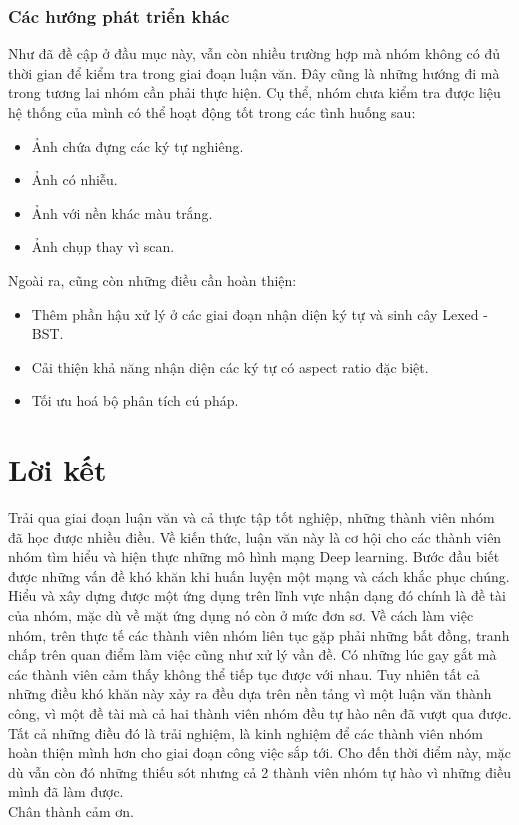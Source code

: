 \documentclass[a4paper]{article}
\theoremstyle{definition}
\begin{document}
	\subsubsection{Các hướng phát triển khác}
	Như đã đề cập ở đầu mục này, vẫn còn nhiều trường hợp mà nhóm không có đủ thời gian để kiểm tra trong giai đoạn luận văn. Đây cũng là những hướng đi mà trong tương lai nhóm cần phải thực hiện. Cụ thể, nhóm chưa kiểm tra được liệu hệ thống của mình có thể hoạt động tốt trong các tình huống sau:
	\begin{itemize}
		\item Ảnh chứa đựng các ký tự nghiêng.
		\item Ảnh có nhiễu.
		\item Ảnh với nền khác màu trắng.
		\item Ảnh chụp thay vì scan.
		
	\end{itemize}
	\vspace{1cm}
	Ngoài ra, cũng còn những điều cần hoàn thiện:
	\begin{itemize}
		\item Thêm phần hậu xử lý ở các giai đoạn nhận diện ký tự và sinh cây Lexed - BST.
		\item Cải thiện khả năng nhận diện các ký tự có aspect ratio đặc biệt.
		\item Tối ưu hoá bộ phân tích cú pháp. 
	\end{itemize}
	
	\newpage
	\section*{Lời kết}
	Trải qua giai đoạn luận văn và cả thực tập tốt nghiệp, những thành viên nhóm đã học được nhiều điều. Về kiến thức, luận văn này là cơ hội cho các thành viên nhóm tìm hiểu và hiện thực những mô hình mạng Deep learning. Bước đầu biết được những vấn đề khó khăn khi huấn luyện một mạng và cách khắc phục chúng. Hiểu và xây dựng được một ứng dụng trên lĩnh vực nhận dạng đó chính là đề tài của nhóm, mặc dù về mặt ứng dụng nó còn ở mức đơn sơ. Về cách làm việc nhóm, trên thực tế các thành viên nhóm liên tục gặp phải những bất đồng, tranh chấp trên quan điểm làm việc cũng như xử lý vần đề. Có những lúc gay gắt mà các thành viên cảm thấy không thể tiếp tục được với nhau. Tuy nhiên tất cả những điều khó khăn này xảy ra đều dựa trên nền tảng vì một luận văn thành công, vì một đề tài mà cả hai thành viên nhóm đều tự hào nên đã vượt qua được. Tất cả những điều đó là trải nghiệm, là kinh nghiệm để các thành viên nhóm hoàn thiện mình hơn cho giai đoạn công việc sắp tới. Cho đến thời điểm này, mặc dù vẫn còn đó những thiếu sót nhưng cả 2 thành viên nhóm tự hào vì những điều mình đã làm được. \\
	Chân thành cảm ơn. 
	\newpage
\end{document}
